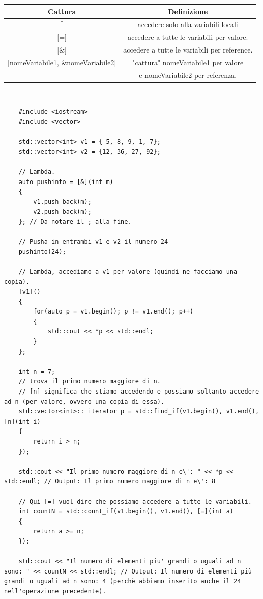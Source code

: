 \begin{tabular}{|c|c|}
	\hline
	\textbf{Cattura} & \textbf{Definizione} \\
	\hline
	\textsf{\small []} & \textsf{\small accedere solo alla variabili locali} \\
	\hline
	\textsf{\small [=]} & \textsf{\small accedere a tutte le variabili per valore.} \\
	\hline
	\textsf{\small [\&]} & \textsf{\small accedere a tutte le variabili per reference.} \\
	\hline
	\textsf{\small [nomeVariabile1, \&nomeVariabile2]} & \textsf{\small "cattura" nomeVariabile1 per valore } \\
	\textsf{\small } & \textsf{\small e nomeVariabile2 per referenza.} \\
	\hline
\end{tabular} \\

\begin{lstlisting}
	#include <iostream>
	#include <vector>
	
	std::vector<int> v1 = { 5, 8, 9, 1, 7};
	std::vector<int> v2 = {12, 36, 27, 92};
	
	// Lambda.
	auto pushinto = [&](int m)
	{
		v1.push_back(m);
		v2.push_back(m);
	}; // Da notare il ; alla fine.

	// Pusha in entrambi v1 e v2 il numero 24
	pushinto(24);
	
	// Lambda, accediamo a v1 per valore (quindi ne facciamo una copia).
	[v1]()
	{
		for(auto p = v1.begin(); p != v1.end(); p++)
		{
			std::cout << *p << std::endl;
		}
	};

	int n = 7;
	// trova il primo numero maggiore di n.
	// [n] significa che stiamo accedendo e possiamo soltanto accedere ad n (per valore, ovvero una copia di essa).
	std::vector<int>:: iterator p = std::find_if(v1.begin(), v1.end(), [n](int i)
	{
		return i > n;
	});

	std::cout << "Il primo numero maggiore di n e\': " << *p << std::endl; // Output: Il primo numero maggiore di n e\': 8

	// Qui [=] vuol dire che possiamo accedere a tutte le variabili.
	int countN = std::count_if(v1.begin(), v1.end(), [=](int a) 
	{
		return a >= n;
	});

	std::cout << "Il numero di elementi piu' grandi o uguali ad n sono: " << countN << std::endl; // Output: Il numero di elementi più grandi o uguali ad n sono: 4 (perchè abbiamo inserito anche il 24 nell'operazione precedente).
\end{lstlisting}

